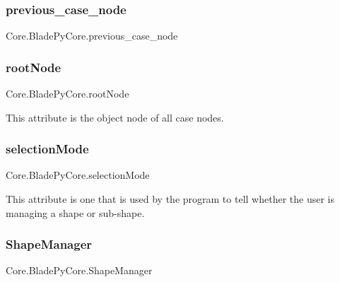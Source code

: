 \hypertarget{a00078_a43d75821c1883b1b972c8e0ef9922b4a}{}\label{a00078_a43d75821c1883b1b972c8e0ef9922b4a} 
\subsubsection{\texorpdfstring{previous\+\_\+case\+\_\+node}{previous\_case\_node}}
{\footnotesize\ttfamily Core.\+Blade\+Py\+Core.\+previous\+\_\+case\+\_\+node}

\hypertarget{a00078_a3cbd742c4a4a706d44d5265e19b25aaa}{}\label{a00078_a3cbd742c4a4a706d44d5265e19b25aaa} 
\subsubsection{\texorpdfstring{root\+Node}{rootNode}}
{\footnotesize\ttfamily Core.\+Blade\+Py\+Core.\+root\+Node}



This attribute is the object node of all case nodes. 

\hypertarget{a00078_a84adec7b4b982bce58747d39e098236f}{}\label{a00078_a84adec7b4b982bce58747d39e098236f} 
\subsubsection{\texorpdfstring{selection\+Mode}{selectionMode}}
{\footnotesize\ttfamily Core.\+Blade\+Py\+Core.\+selection\+Mode}



This attribute is one that is used by the program to tell whether the user is managing a shape or sub-\/shape. 

\hypertarget{a00078_a1e75ee619926a396b584090b2707b1ca}{}\label{a00078_a1e75ee619926a396b584090b2707b1ca} 
\subsubsection{\texorpdfstring{Shape\+Manager}{ShapeManager}}
{\footnotesize\ttfamily Core.\+Blade\+Py\+Core.\+Shape\+Manager}



